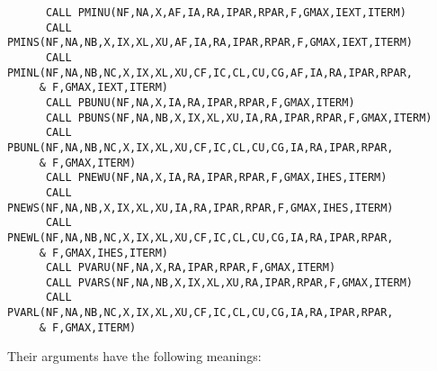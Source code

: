 \documentclass{article}
\begin{document}
{\small

\begin{verbatim}
      CALL PMINU(NF,NA,X,AF,IA,RA,IPAR,RPAR,F,GMAX,IEXT,ITERM)
      CALL PMINS(NF,NA,NB,X,IX,XL,XU,AF,IA,RA,IPAR,RPAR,F,GMAX,IEXT,ITERM)
      CALL PMINL(NF,NA,NB,NC,X,IX,XL,XU,CF,IC,CL,CU,CG,AF,IA,RA,IPAR,RPAR,
     & F,GMAX,IEXT,ITERM)
      CALL PBUNU(NF,NA,X,IA,RA,IPAR,RPAR,F,GMAX,ITERM)
      CALL PBUNS(NF,NA,NB,X,IX,XL,XU,IA,RA,IPAR,RPAR,F,GMAX,ITERM)
      CALL PBUNL(NF,NA,NB,NC,X,IX,XL,XU,CF,IC,CL,CU,CG,IA,RA,IPAR,RPAR,
     & F,GMAX,ITERM)
      CALL PNEWU(NF,NA,X,IA,RA,IPAR,RPAR,F,GMAX,IHES,ITERM)
      CALL PNEWS(NF,NA,NB,X,IX,XL,XU,IA,RA,IPAR,RPAR,F,GMAX,IHES,ITERM)
      CALL PNEWL(NF,NA,NB,NC,X,IX,XL,XU,CF,IC,CL,CU,CG,IA,RA,IPAR,RPAR,
     & F,GMAX,IHES,ITERM)
      CALL PVARU(NF,NA,X,RA,IPAR,RPAR,F,GMAX,ITERM)
      CALL PVARS(NF,NA,NB,X,IX,XL,XU,RA,IPAR,RPAR,F,GMAX,ITERM)
      CALL PVARL(NF,NA,NB,NC,X,IX,XL,XU,CF,IC,CL,CU,CG,IA,RA,IPAR,RPAR,
     & F,GMAX,ITERM)
\end{verbatim}

}

Their arguments have the following meanings:


\vspace{2mm}
\end{document}
